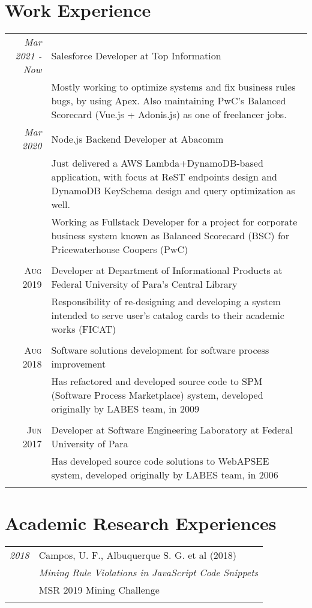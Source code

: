 \documentclass[a4paper,10pt]{article}
\begin{document}
\section{Work Experience}
\begin{tabular}{r|p{11cm}}
 \emph{Mar 2021 - Now} & Salesforce Developer at Top Information\\
 & \footnotesize{Mostly working to optimize systems and fix business rules bugs, by using Apex. 
    Also maintaining PwC's Balanced Scorecard (Vue.js + Adonis.js) as one of freelancer jobs.}\\
 \emph{Mar 2020} & Node.js Backend Developer at Abacomm\\
 & \footnotesize{Just delivered a AWS Lambda+DynamoDB-based application, with focus at ReST endpoints design and DynamoDB KeySchema design and query optimization as well.} \\
 & \footnotesize{Working as Fullstack Developer for a project for corporate business system known as Balanced Scorecard (BSC) for Pricewaterhouse Coopers (PwC)} \\\\\textsc{
 Aug 2019} & Developer at Department of Informational Products at Federal University of Para's Central Library\\ 
 & \footnotesize{Responsibility of re-designing and developing a system intended to serve user's catalog cards to their academic works (FICAT)} \\\\
 \textsc{Aug 2018 }& Software solutions development for software process improvement\\& \footnotesize{Has refactored and developed source code to SPM (Software Process Marketplace) system, developed originally by LABES team, in 2009}\\\\
 \textsc{Jun 2017} & Developer at Software Engineering Laboratory at Federal University of Para \\ &\footnotesize{Has developed source code solutions to WebAPSEE system, developed originally by LABES team, in 2006}\\\multicolumn{2}{c}{} \\
\end{tabular}

\section{Academic Research Experiences}
\begin{tabular}{r|p{11cm}}
 \emph{2018} & Campos, U. F., Albuquerque S. G. et al (2018)\\
 & \textit{Mining Rule Violations in JavaScript Code Snippets}\\
 & MSR 2019 Mining Challenge\\\multicolumn{2}{c}{} \\
\end{tabular}
\end{document}
